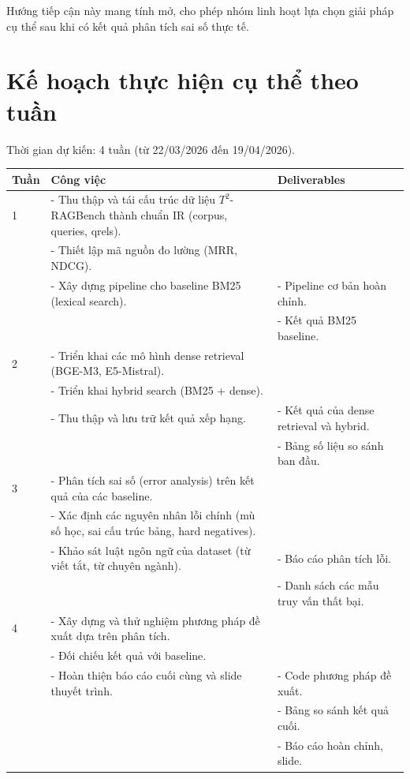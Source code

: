 \documentclass[12pt,a4paper]{article}
\begin{document}
Hướng tiếp cận này mang tính mở, cho phép nhóm linh hoạt lựa chọn giải pháp cụ thể sau khi có kết quả phân tích sai số thực tế.

\section{Kế hoạch thực hiện cụ thể theo tuần}

Thời gian dự kiến: 4 tuần (từ 22/03/2026 đến 19/04/2026).

\begin{table}[h!]
\centering
\begin{tabular}{|p{2.5cm}|p{9cm}|p{3cm}|}
\hline
\textbf{Tuần} & \textbf{Công việc} & \textbf{Deliverables} \\ \hline
1 & - Thu thập và tái cấu trúc dữ liệu $T^2$-RAGBench thành chuẩn IR (corpus, queries, qrels).\\
& - Thiết lập mã nguồn đo lường (MRR, NDCG).\\
& - Xây dựng pipeline cho baseline BM25 (lexical search). & - Pipeline cơ bản hoàn chỉnh.\\
& & - Kết quả BM25 baseline. \\ \hline
2 & - Triển khai các mô hình dense retrieval (BGE-M3, E5-Mistral).\\
& - Triển khai hybrid search (BM25 + dense).\\
& - Thu thập và lưu trữ kết quả xếp hạng. & - Kết quả của dense retrieval và hybrid.\\
& & - Bảng số liệu so sánh ban đầu. \\ \hline
3 & - Phân tích sai số (error analysis) trên kết quả của các baseline.\\
& - Xác định các nguyên nhân lỗi chính (mù số học, sai cấu trúc bảng, hard negatives).\\
& - Khảo sát luật ngôn ngữ của dataset (từ viết tắt, từ chuyên ngành). & - Báo cáo phân tích lỗi.\\
& & - Danh sách các mẫu truy vấn thất bại. \\ \hline
4 & - Xây dựng và thử nghiệm phương pháp đề xuất dựa trên phân tích.\\
& - Đối chiếu kết quả với baseline.\\
& - Hoàn thiện báo cáo cuối cùng và slide thuyết trình. & - Code phương pháp đề xuất.\\
& & - Bảng so sánh kết quả cuối.\\
& & - Báo cáo hoàn chỉnh, slide. \\ \hline
\end{tabular}
\end{table}
\end{document}
